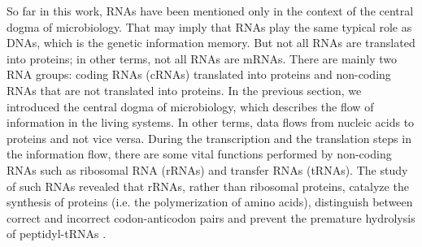 So far in this work, RNAs have been mentioned only in the context of the central dogma of microbiology. That may imply that RNAs play the same typical role as DNAs, which is the genetic information memory. But not all RNAs are translated into proteins; in other terms, not all RNAs are mRNAs. There are mainly two RNA groups: coding RNAs (cRNAs) translated into proteins and non-coding RNAs that are not translated into proteins. In the previous section, we introduced the central dogma of microbiology, which describes the flow of information in the living systems. In other terms, data flows from nucleic acids to proteins and not vice versa. During the transcription and the translation steps in the information flow, there are some vital functions performed by non-coding RNAs such as ribosomal RNA (rRNAs) and transfer RNAs (tRNAs). The study of such RNAs revealed that rRNAs, rather than ribosomal proteins, catalyze the synthesis of proteins (i.e. the polymerization of amino acids), distinguish between correct and incorrect codon-anticodon pairs and prevent the premature hydrolysis of peptidyl-tRNAs \cite{moore2011roles, breaker2006rna}.

